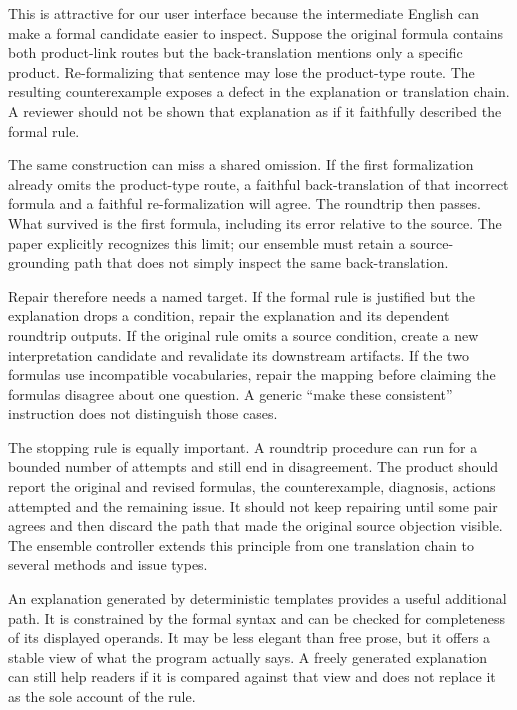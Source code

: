 \documentclass[12pt,a4paper,oneside,openany]{book}
\begin{document}
This is attractive for our user interface because the intermediate English
can make a formal candidate easier to inspect. Suppose the original formula
contains both product-link routes but the back-translation mentions only a
specific product. Re-formalizing that sentence may lose the product-type
route. The resulting counterexample exposes a defect in the explanation or
translation chain. A reviewer should not be shown that explanation as if it
faithfully described the formal rule.

The same construction can miss a shared omission. If the first formalization
already omits the product-type route, a faithful back-translation of that
incorrect formula and a faithful re-formalization will agree. The roundtrip
then passes. What survived is the first formula, including its error relative
to the source. The paper explicitly recognizes this limit; our ensemble must
retain a source-grounding path that does not simply inspect the same
back-translation.

Repair therefore needs a named target. If the formal rule is justified but
the explanation drops a condition, repair the explanation and its dependent
roundtrip outputs. If the original rule omits a source condition, create a
new interpretation candidate and revalidate its downstream artifacts. If the
two formulas use incompatible vocabularies, repair the mapping before claiming
the formulas disagree about one question. A generic ``make these consistent''
instruction does not distinguish those cases.

The stopping rule is equally important. A roundtrip procedure can run for a
bounded number of attempts and still end in disagreement. The product should
report the original and revised formulas, the counterexample, diagnosis,
actions attempted and the remaining issue. It should not keep repairing
until some pair agrees and then discard the path that made the original
source objection visible. The ensemble controller extends this principle
from one translation chain to several methods and issue types.

An explanation generated by deterministic templates provides a useful
additional path. It is constrained by the formal syntax and can be checked
for completeness of its displayed operands. It may be less elegant than
free prose, but it offers a stable view of what the program actually says.
A freely generated explanation can still help readers if it is compared
against that view and does not replace it as the sole account of the rule.
\end{document}
